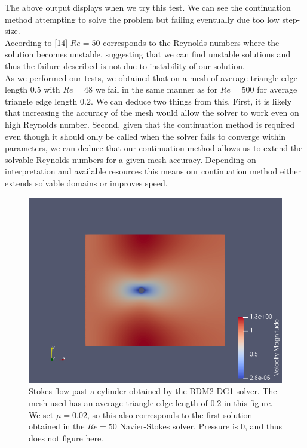 \documentclass[11pt,twoside,a4paper]{article}
\begin{document}
The above output displays when we try this test. We can see the continuation method attempting to solve the problem but failing eventually due too low step-size.\\
According to [14] $Re = 50$ corresponds to the Reynolds numbers where the solution becomes unstable, suggesting that we can find unstable solutions and thus the failure described is not due to instability of our solution.\\
As we performed our tests, we obtained that on a mesh of average triangle edge length $0.5$ with $Re = 48$ we fail in the same manner as for $Re = 500$ for average triangle edge length $0.2$. We can deduce two things from this. First, it is likely that increasing the accuracy of the mesh would allow the solver to work even on high Reynolds number. Second, given that the continuation method is required even though it should only be called when the solver fails to converge within parameters, we can deduce that our continuation method allows us to extend the solvable Reynolds numbers for a given mesh accuracy. Depending on interpretation and available resources this means our continuation method either extends solvable domains or improves speed.

\begin{figure}
  \includegraphics[width=\linewidth]{scR50.png}
  \caption{Stokes flow past a cylinder obtained by the BDM2-DG1 solver. The mesh used has an average triangle edge length of $0.2$ in this figure. We set $\mu = 0.02$, so this also corresponds to the first solution obtained in the $Re =50$ Navier-Stokes solver. Pressure is $0$, and thus does not figure here.}
\end{figure}
\end{document}
